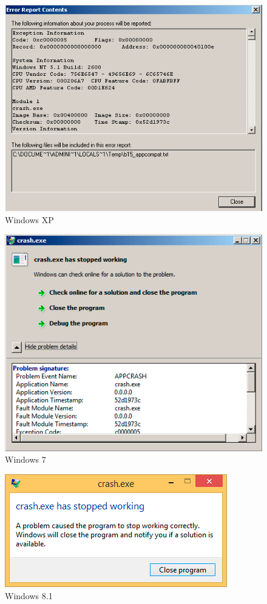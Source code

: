 \begin{figure}[H]
\centering
\includegraphics[scale=\NormalScale]{OS/SEH/1/crash_xp2.png}
\caption{Windows XP}
\end{figure}

\begin{figure}[H]
\centering
\includegraphics[scale=\NormalScale]{OS/SEH/1/crash_win7.png}
\caption{Windows 7}
\end{figure}

\begin{figure}[H]
\centering
\includegraphics[scale=\NormalScale]{OS/SEH/1/crash_win81.png}
\caption{Windows 8.1}
\end{figure}

